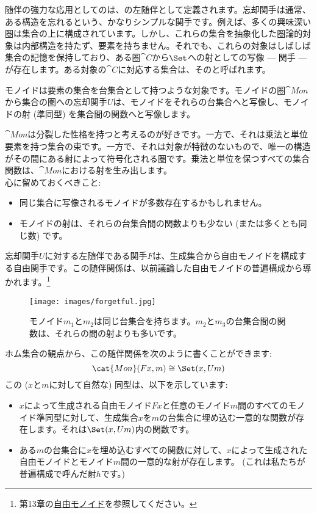 
\lettrine[lhang=0.17]{随}{伴}の強力な応用としてのは、の左随伴として定義されます。忘却関手は通常、ある構造を忘れるという、かなりシンプルな関手です。例えば、多くの興味深い圏は集合の上に構成されています。しかし、これらの集合を抽象化した圏論的対象は内部構造を持たず、要素を持ちません。それでも、これらの対象はしばしば集合の記憶を保持しており、ある圏$\cat{C}$から$\Set$への射としての写像 --- 関手 --- が存在します。ある対象の$\cat{C}$に対応する集合は、そのと呼ばれます。

モノイドは要素の集合を台集合として持つような対象です。モノイドの圏$\cat{Mon}$から集合の圏への忘却関手$U$は、モノイドをそれらの台集合へと写像し、モノイドの射 (準同型) を集合間の関数へと写像します。

$\cat{Mon}$は分裂した性格を持つと考えるのが好きです。一方で、それは乗法と単位要素を持つ集合の束です。一方で、それは対象が特徴のないもので、唯一の構造がその間にある射によって符号化される圏です。乗法と単位を保つすべての集合関数は、$\cat{Mon}$における射を生み出します。\\
\newline
心に留めておくべきこと:

\begin{itemize}
  \tightlist
  \item
        同じ集合に写像されるモノイドが多数存在するかもしれません。
  \item
        モノイドの射は、それらの台集合間の関数よりも少ない (または多くとも同じ数) です。
\end{itemize}

\noindent
忘却関手$U$に対する左随伴である関手$F$は、生成集合から自由モノイドを構成する自由関手です。この随伴関係は、以前議論した自由モノイドの普遍構成から導かれます。\footnote{第13章の\hyperref[free-monoids]{自由モノイド}を参照してください。}

\begin{figure}[H]
  \centering
  \texttt{[image: images/forgetful.jpg]}
  \caption{モノイド$m_1$と$m_2$は同じ台集合を持ちます。$m_2$と$m_3$の台集合間の関数は、それらの間の射よりも多いです。}
\end{figure}

\noindent
ホム集合の観点から、この随伴関係を次のように書くことができます:
\[\cat{Mon}(F x, m) \cong \Set(x, U m)\]
この ($x$と$m$に対して自然な) 同型は、以下を示しています:

\begin{itemize}
  \tightlist
  \item
        $x$によって生成される自由モノイド$F x$と任意のモノイド$m$間のすべてのモノイド準同型に対して、生成集合$x$を$m$の台集合に埋め込む一意的な関数が存在します。それは$\Set(x, U m)$内の関数です。
  \item
        ある$m$の台集合に$x$を埋め込むすべての関数に対して、$x$によって生成された自由モノイドとモノイド$m$間の一意的な射が存在します。 (これは私たちが普遍構成で呼んだ射$h$です。) 
\end{itemize}

